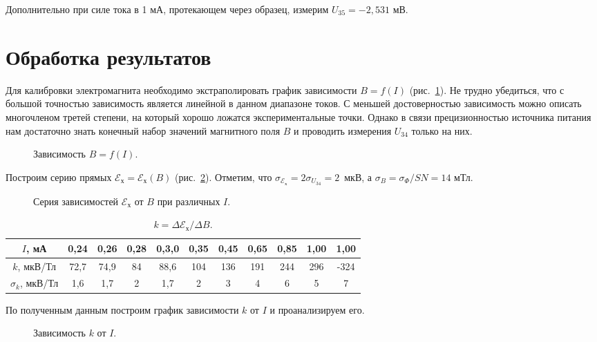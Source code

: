 \documentclass[a4paper,12pt]{article} %
\begin{document}
Дополнительно при силе тока в 1 мА, протекающем через образец, измерим $U_{35} = -2,531$ мВ.
		
\newpage
\section {Обработка результатов}
	Для калибровки электромагнита необходимо экстраполировать график зависимости $B = f(I)$ (рис.~\ref{ris:B=f(I)}). Не трудно убедиться, что с большой точностью зависимость является линейной в данном диапазоне токов. С меньшей достоверностью зависимость можно описать многочленом третей степени, на который хорошо ложатся экспериментальные точки. Однако в связи прецизионностью источника питания нам достаточно знать конечный набор значений магнитного поля $B$ и проводить измерения $U_{34}$ только на них.
	\begin{figure}[H]
		\center{\texttt{[image: B=f(I).pdf]}}
		\caption{Зависимость $B = f(I)$.}
		\label{ris:B=f(I)}
	\end{figure}


	Построим серию прямых $\mathscr{E}_\text{х} =\mathscr{E}_\text{х} (B)$ (рис.~\ref{ris:Ex}). Отметим, что $\sigma_{\mathscr{E}_\text{х}} = 2 \sigma_{U_{34}} = 2$~мкВ, а $\sigma_B = \sigma_\Phi / SN = 14$ мТл.
	\begin{figure}[H]
		\caption{Серия зависимостей $\mathscr{E}_\text{х}$ от $B$ при различных $I$.}
		\label{ris:Ex}
	\end{figure}
\newpage
		\begin{table}[H]
		\caption{$k = \Delta \mathscr{E}_\text{х} / \Delta B $.}
		\label{table:k}
		\begin{tabular}{|c|c|c|c|c|c|c|c|c|c|c|}
			\hline
			$I$, мА            & 0,24 & 0,26 & 0,28 & 0,3,0 & 0,35 & 0,45 & 0,65 & 0,85 & 1,00 & 1,00 \\ \hline
			$k$, мкВ/Тл        & 72,7 & 74,9 & 84   & 88,6  & 104  & 136  & 191  & 244  & 296  & -324 \\ \hline
			$\sigma_k$, мкВ/Тл & 1,6  & 1,7  & 2    & 1,7   & 2    & 3    & 4    & 6    & 5    & 7    \\ \hline
		\end{tabular}
	\end{table}


	По полученным данным построим график зависимости $k$ от $I$ и проанализируем его.
	\begin{figure}[H]
		\center{\texttt{[image: k=k(I).pdf]}}
		\caption{Зависимость $k$ от $I$.}
		\label{ris:k=k(I)}
	\end{figure}
\end{document}
